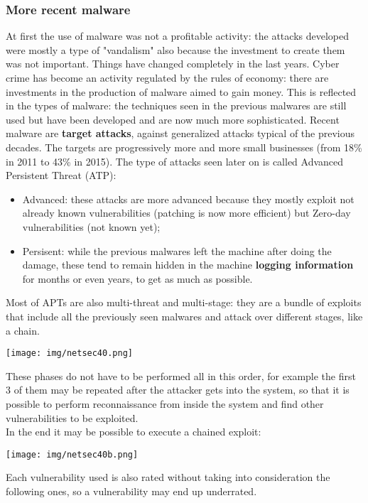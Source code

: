 \documentclass[a4paper, 10pt, titlepage]{article}
\begin{document}
\subsubsection*{More recent malware}
At first the use of malware was not a profitable activity: the attacks developed were mostly a type of "vandalism" also because the investment to create them was not important. Things have changed completely in the last years. Cyber crime has become an activity regulated by the rules of economy: there are investments in the production of malware aimed to gain money. This is reflected in the types of malware: the techniques seen in the previous malwares are still used but have been developed and are now much more sophisticated. Recent malware are \textbf{target attacks}, against generalized attacks typical of the previous decades.
The targets are progressively more and more small businesses (from 18\% in 2011 to 43\% in 2015). The type of attacks seen later on is called Advanced Persistent Threat (ATP):
\begin{itemize}
	\item Advanced: these attacks are more advanced because they mostly exploit not already known vulnerabilities (patching is now more efficient) but Zero-day vulnerabilities (not known yet);
	\item Persisent: while the previous malwares left the machine after doing the damage, these tend to remain hidden in the machine \textbf{logging information} for months or even years, to get as much as possible. 
\end{itemize}
Most of APTs are also multi-threat and multi-stage: they are a bundle of exploits that include all the previously seen malwares and attack over different stages, like a chain.
\begin{center}
	\texttt{[image: img/netsec40.png]}
\end{center}
These phases do not have to be performed all in this order, for example the first 3 of them may be repeated after the attacker gets into the system, so that it is possible to perform reconnaissance from inside the system and find other vulnerabilities to be exploited. \\
In the end it may be possible to execute a chained exploit:
\begin{center}
	\texttt{[image: img/netsec40b.png]}
\end{center}
Each vulnerability used is also rated without taking into consideration the following ones, so a vulnerability may end up underrated.
\end{document}
